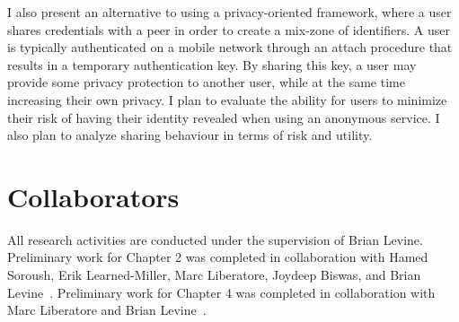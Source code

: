 I also present an alternative to using a privacy-oriented framework, where a user shares credentials with a peer in order to create a mix-zone of identifiers. A user is typically authenticated on a mobile network through an attach procedure that results in a temporary authentication key. By sharing this key, a user may provide some privacy protection to another user, while at the same time increasing their own privacy. I plan to evaluate the ability for users to minimize their risk of having their identity revealed when using an anonymous service. I also plan to analyze sharing behaviour in terms of risk and utility. %

\section*{Collaborators}
All research activities are conducted under the supervision of Brian Levine. Preliminary work for Chapter 2 was completed in collaboration with Hamed Soroush, Erik Learned-Miller, Marc Liberatore, Joydeep Biswas, and Brian Levine~\cite{soroush2013turning}. Preliminary work for Chapter 4 was completed in collaboration with Marc Liberatore and Brian Levine~\cite{Sung:2014}.